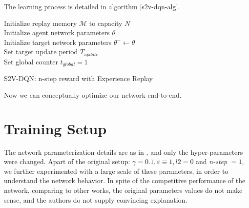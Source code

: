 \documentclass[10pt,a4paper,draft]{article}
\begin{document}
The learning process is detailed in algorithm \eqref{s2v-dqn-alg}.


\begin{algorithm}[H]
	\SetAlgoLined
	\DontPrintSemicolon
	\KwResult{$\theta$}
 	Initialize replay memory $\mathcal{M}$ to capacity $N$ \\
	Initialize agent network parameters $\theta$ \\
	Initialize target network parameters $\theta^- \leftarrow \theta$ \\
	Set target update period $T_{update}$ \\ 
	Set global counter $t_{global} = 1$ \\
	\caption{S2V-DQN: n-step reward with Experience Replay}
 	\label{s2v-dqn-alg}
\end{algorithm}

Now we can conceptually optimize our network end-to-end.

\section{Training Setup} \label{sec-training}
The network parameterization details are as in \cite{dai17-tsp-s2v}, and only the hyper-parameters were changed. Apart of the original setup: $\gamma=0.1, \varepsilon \equiv 1, l2=0$ and \textit{n-step} $=1$, we further experimented with a large scale of these parameters, in order to understand the network behavior. In spite of the competitive performance of the network, comparing to other works, the original parameters values do not make sense, and the authors do not supply convincing explanation.
\end{document}
